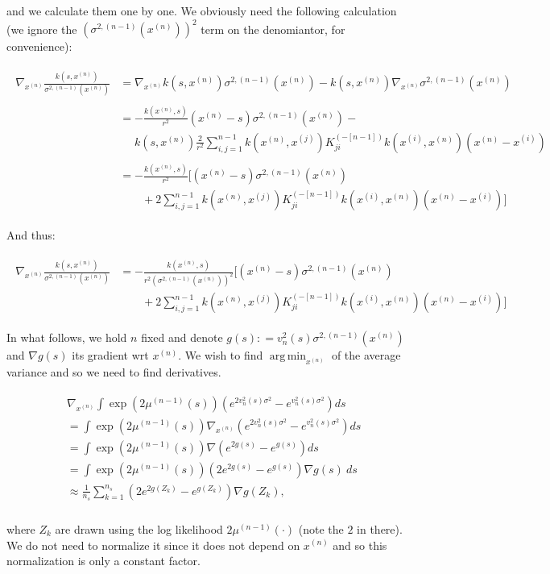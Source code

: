 \documentclass[paper=a4, fontsize=11pt]{scrartcl} %
\DeclareMathOperator*{\argmin}{arg\,min}
\numberwithin{equation}{section} %
\numberwithin{figure}{section} %
\numberwithin{table}{section} %
\newcommand{\gxn}{\nabla_{x^{(n)}}} %
\newcommand{\xn}{x^{(n)}}
\newcommand{\xii}{x^{(i)}}
\newcommand{\xj}{x^{(j)}}
\newcommand{\Kinvnm}{K^{(-[n-1])}}
\newcommand{\sqnm}{\sigma ^{2 , (n-1)}     }
\newcommand{\signxn}{\sigma^{2, (n-1)} (\xn)}
\begin{document}
and we calculate them one by one. We obviously need the following calculation (we ignore the $(\signxn)^2$ term on the denomiantor, for convenience):

\begin{align}
 \begin{split}
\gxn \frac{ k(s, \xn) }{\signxn} &= \gxn k(s, \xn)\signxn - k(s, \xn)\gxn\signxn \\\\
%
%
%
&= -\frac{k(\xn ,s)}{r^2} (\xn-s)\signxn -  \\
	   & \ \ \ \ \ \ k(s, \xn) \frac{2}{r^2}\sum_{i,j=1}^{n-1} k(\xn,\xj) \Kinvnm_{ji} k(\xii ,\xn) (\xn-\xii)\\\\
%
%
&= -\frac{k(\xn ,s)}{r^2} [(\xn -s) \signxn \\ 
     & \ \ \ \ \ \ \ \ \ + 2\sum_{i,j=1}^{n-1} k(\xn,\xj) \Kinvnm_{ji} k(\xii ,\xn) (\xn-\xii)]
 \end{split}
\end{align}

And thus:

\begin{align}
 \begin{split}
\gxn \frac{ k(s, \xn) }{\signxn} & = -\frac{k(\xn ,s)}{r^2(\signxn)^2} [(\xn -s) \signxn \\ 
		& \ \ \ \ \ \ \ \ \ + 2\sum_{i,j=1}^{n-1} k(\xn,\xj) \Kinvnm_{ji} k(\xii ,\xn) (\xn-\xii)]
 \end{split}
\end{align}


In what follows, we hold $n$ fixed and denote $g(s) : = v_n^2(s)\sqnm(\xn)$ and $\nabla g(s)$ its gradient wrt $\xn$. We wish to find 
$\argmin_{\xn}$ of the average variance and so we need to find derivatives.

\begin{align}
 \begin{split}
 & \gxn \int \exp(2\mu^{(n-1)}(s)) (e^{2v^2_n(s)\sigma^2 } - e^{v^2_n(s)\sigma^2 }) ds \\
%
%
% 
&=  \int \exp(2\mu^{(n-1)}(s)) \gxn (e^{2v^2_n(s)\sigma^2 } - e^{v^2_n(s)\sigma^2 }) ds \\
%
%
%
%
%
% 
&=  \int \exp(2\mu^{(n-1)}(s)) \nabla (e^{2g(s) } - e^{g(s)}) ds \\
%
%
% 
%
%
%
% 
&=  \int \exp(2\mu^{(n-1)}(s)) (2e^{2g(s) } - e^{g(s)})\nabla g(s)\  ds \\
%
%
% 
%
%
%
% 
&\approx \frac{1}{n_s}  \sum_{k=1}^{n_s} (2e^{2g(Z_k) } - e^{g(Z_k)})\nabla g(Z_k), \\
%
%
% 
 \end{split}
\end{align}

where $Z_k$ are drawn using the log likelihood $2\mu^{(n-1)}(\cdot)$ (note the $2$ in there). We do not need to normalize it since it does not depend 
on $x^{(n)}$ and so this normalization is only a constant factor.
\end{document}
